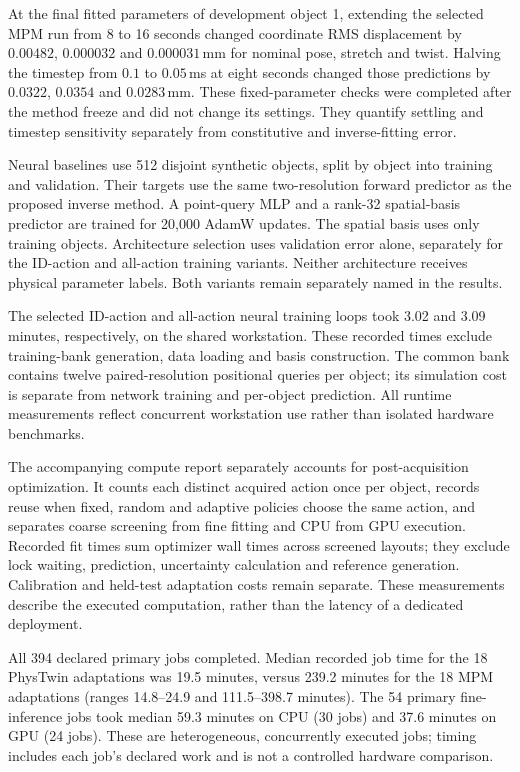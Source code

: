 \documentclass[10pt,twocolumn,letterpaper]{article}
\begin{document}
At the final fitted parameters of development object 1, extending the selected MPM run from 8 to 16 seconds changed coordinate RMS displacement by $0.00482$, $0.000032$ and $0.000031$\,mm for nominal pose, stretch and twist. Halving the timestep from $0.1$ to $0.05$\,ms at eight seconds changed those predictions by $0.0322$, $0.0354$ and $0.0283$\,mm. These fixed-parameter checks were completed after the method freeze and did not change its settings. They quantify settling and timestep sensitivity separately from constitutive and inverse-fitting error.

Neural baselines use 512 disjoint synthetic objects, split by object into training and validation. Their targets use the same two-resolution forward predictor as the proposed inverse method. A point-query MLP and a rank-32 spatial-basis predictor are trained for 20,000 AdamW updates. The spatial basis uses only training objects. Architecture selection uses validation error alone, separately for the ID-action and all-action training variants. Neither architecture receives physical parameter labels. Both variants remain separately named in the results.

The selected ID-action and all-action neural training loops took 3.02 and 3.09 minutes, respectively, on the shared workstation. These recorded times exclude training-bank generation, data loading and basis construction. The common bank contains twelve paired-resolution positional queries per object; its simulation cost is separate from network training and per-object prediction. All runtime measurements reflect concurrent workstation use rather than isolated hardware benchmarks.

The accompanying compute report separately accounts for post-acquisition optimization. It counts each distinct acquired action once per object, records reuse when fixed, random and adaptive policies choose the same action, and separates coarse screening from fine fitting and CPU from GPU execution. Recorded fit times sum optimizer wall times across screened layouts; they exclude lock waiting, prediction, uncertainty calculation and reference generation. Calibration and held-test adaptation costs remain separate. These measurements describe the executed computation, rather than the latency of a dedicated deployment.

All 394 declared primary jobs completed. Median recorded job time for the 18 PhysTwin adaptations was 19.5 minutes, versus 239.2 minutes for the 18 MPM adaptations (ranges 14.8--24.9 and 111.5--398.7 minutes). The 54 primary fine-inference jobs took median 59.3 minutes on CPU (30 jobs) and 37.6 minutes on GPU (24 jobs). These are heterogeneous, concurrently executed jobs; timing includes each job's declared work and is not a controlled hardware comparison.
\end{document}
